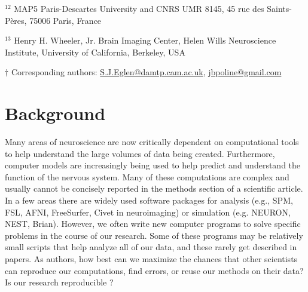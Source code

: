\documentclass[11pt]{article}
\begin{document}
\noindent $^{12}$ MAP5 Paris-Descartes University and CNRS UMR 8145, 
45 rue des Saints-P\`{e}res, 75006 Paris, France

\noindent $^{13}$  Henry H. Wheeler, Jr. Brain Imaging Center, Helen Wills Neuroscience Institute, University of California, Berkeley, USA

\vspace*{2mm}
\noindent $\dagger$
Corresponding authors: \url{S.J.Eglen@damtp.cam.ac.uk}, \url{jbpoline@gmail.com}

\clearpage


\renewcommand{\cite}[1]{\autocite{#1}}

\linenumbers

\section*{Background}

Many areas of neuroscience are now critically dependent on
computational tools to help understand the large volumes of data being
created.  Furthermore, computer models are increasingly being used to
help predict and understand the function of the nervous system.  Many
of these computations are complex and usually cannot be concisely
reported in the methods section of a scientific article.  In a few
areas there are widely used software packages for
analysis (e.g., SPM, FSL, AFNI, FreeSurfer, Civet in
neuroimaging) or simulation (e.g. NEURON, NEST, Brian).
However, we often write new computer programs to solve
specific problems in the course of our research.  Some of these
programs may be relatively small scripts that help analyze all of our
data, and these rarely get described in papers.  As authors, how best
can we maximize the chances that other scientists can reproduce our
computations, find errors, or reuse our methods on their data?  Is our research
reproducible \cite{web:naturefocus}?
\end{document}
